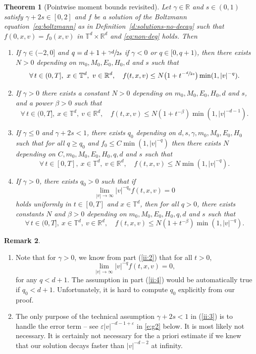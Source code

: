\documentclass[JEP,XML,SOM,Unicode,NoFloatCountersInSection]{cedram}
\theoremstyle{plain}
\newtheorem{thm}{Theorem}[section]
\theoremstyle{definition}
\newtheorem{remark}[thm]{Remark}
\numberwithin{equation}{section}
\newcommand{\R}{\mathbb R}
\newcommand{\eps}{\varepsilon}
\let\A N
\begin{document}
\begin{thm}[Pointwise moment bounds revisited]\label{thm:upper2}
Let $\gamma \in \R$ and $s \in (0,1)$ satisfy $\gamma +2s \in [0,2]$
and $f$ be a solution of the Boltzmann equation~\eqref{eq:boltzmann}
as in Definition~\ref{d:solutions-no-decay} such that
$f(0,x,v)=f_0(x,v)$ in $\mathbb{T}^d \times \R^d$ and \eqref{eq:non-deg}
holds. Then
\begin{enumerate}
\item \label{ii:1} If $\gamma \in (-2,0]$ and
$q = d+1+\sfrac{\gamma d}{2s}$ if $\gamma <0$ or $q \in [0,q+1)$,
then there exists $\A>0$ depending on $m_0,M_0,E_0, H_0, d$ and $s$
such that
\[
\forall \, t \in (0,T], \ x \in \mathbb{T}^d, \ v \in \R^d, \quad
f(t,x,v) \le \A \bigl(1+t^{-\sfrac{d}{2s}} \bigr) \min
(1,|v|^{-q}).
\]
\item \label{ii:2} If $\gamma >0$ there exists a constant $\A>0$
depending on $m_0,M_0,E_0,H_0,d$ and $s$, and a power $\beta>0$ such
that
\[ \forall \, t \in (0,T], \ x \in \mathbb{T}^d, \ v \in \R^d, \quad
f(t,x,v) \le \A \left(1+t^{-\beta} \right) \min(1,|v|^{-d-1}
).\]
\item \label{ii:3} If $\gamma \leq 0$ and $\gamma+2s < 1$, there
exists $q_0$ depending on $d,s,\gamma, m_0,M_0,E_0,H_0$ such that for
all $q \ge q_0$ and $f_0 \le C \min (1 , |v|^{-q})$ then there
exists $\A$ depending on $C,m_0,M_0,E_0,H_0,q, d$ and $s$ such that
\[
\forall \, t \in [0,T], \ x \in \mathbb{T}^d, \ v \in \R^d, \quad
f (t,x,v) \le \A \min(1, |v|^{-q}).
\]
\item \label{ii:4} If $\gamma > 0$, there exists $q_0 >0$ such that if
\[ \lim_{|v| \to \infty} |v|^{-q_0} f(t,x,v) = 0\] holds
uniformly in $t \in [0,T]$ and $x \in \mathbb{T}^d$, then for all
$q>0$, there exists constants $\A$ and $\beta>0$ depending on
$m_0,M_0,E_0,H_0,q,d$ and $s$ such that
\[
\forall \, t \in (0,T], \ x \in \mathbb{T}^d, \ v \in \R^d,
\quad f(t,x,v) \le \A \left(1+t^{-\beta} \right) \min
(1,|v|^{-q}).
\]
\end{enumerate}
\end{thm}

\skpt
\begin{remark}
\begin{enumerate}
\item Note that for $\gamma >0$, we know from part (\ref{ii:2})
that for all $t>0$,
\[ \lim_{|v| \to \infty} |v|^{-q} f(t,x,v) = 0, \]
for any $q <
d+1$. The assumption in part (\ref{ii:4}) would be automatically
true if $q_0 < d+1$. Unfortunately, it is hard to compute $q_0$
explicitly from our proof.
\item \label{rem:gammaplus2s}
The only purpose of the technical assumption $\gamma+2s<1$ in
(\ref{ii:3}) is to handle the error term -- see
$\eps |v|^{-d-1+\eps}$ in \eqref{e:g2} below. It is most likely not
necessary. It is certainly not necessary for the a priori estimate
if we knew that our solution decays faster than $|v|^{-d-2}$ at
infinity.
\end{enumerate}
\end{remark}
\end{document}
